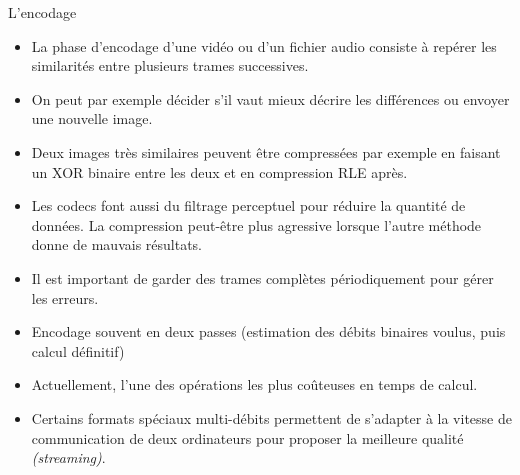 \begin{frame}{L'encodage}
  \begin{itemize}
  \item La phase d'encodage d'une vidéo ou d'un fichier audio consiste à
    repérer les similarités entre plusieurs trames successives.
  \item On peut par exemple décider s'il vaut mieux décrire les différences ou
    envoyer une nouvelle image.
  \item Deux images très similaires peuvent être compressées par exemple en
    faisant un XOR binaire entre les deux et en compression RLE après.
  \item Les codecs font aussi du filtrage perceptuel pour réduire la quantité
    de données. La compression peut-être plus agressive lorsque l'autre
    méthode donne de mauvais résultats.
  \item Il est important de garder des trames complètes périodiquement pour
    gérer les erreurs.
  \item Encodage souvent en deux passes (estimation des débits binaires
    voulus, puis calcul définitif)
  \item Actuellement, l'une des opérations les plus coûteuses en temps de
    calcul.
  \item Certains formats spéciaux multi-débits permettent de s'adapter à la
    vitesse de communication de deux ordinateurs pour proposer la meilleure
    qualité \emph{(streaming)}.
  \end{itemize}
\end{frame}

